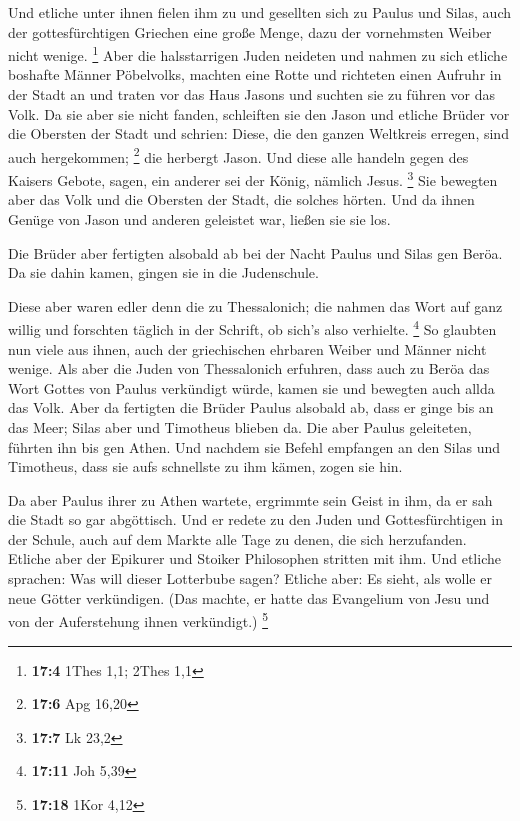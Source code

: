  Und etliche unter ihnen fielen ihm zu und gesellten sich
zu Paulus und Silas, auch der gottesfürchtigen Griechen eine große
Menge, dazu der vornehmsten Weiber nicht wenige. \footnote{\textbf{17:4}
  1Thes 1,1; 2Thes 1,1}  Aber die halsstarrigen Juden
neideten und nahmen zu sich etliche boshafte Männer Pöbelvolks, machten
eine Rotte und richteten einen Aufruhr in der Stadt an und traten vor
das Haus Jasons und suchten sie zu führen vor das Volk. 
Da sie aber sie nicht fanden, schleiften sie den Jason und etliche
Brüder vor die Obersten der Stadt und schrien: Diese, die den ganzen
Weltkreis erregen, sind auch hergekommen; \footnote{\textbf{17:6} Apg
  16,20}  die herbergt Jason. Und diese alle handeln gegen
des Kaisers Gebote, sagen, ein anderer sei der König, nämlich Jesus.
\footnote{\textbf{17:7} Lk 23,2}  Sie bewegten aber das
Volk und die Obersten der Stadt, die solches hörten.  Und
da ihnen Genüge von Jason und anderen geleistet war, ließen sie sie los.

 Die Brüder aber fertigten alsobald ab bei der Nacht
Paulus und Silas gen Beröa. Da sie dahin kamen, gingen sie in die
Judenschule.

 Diese aber waren edler denn die zu Thessalonich; die
nahmen das Wort auf ganz willig und forschten täglich in der Schrift, ob
sich's also verhielte. \footnote{\textbf{17:11} Joh 5,39}
 So glaubten nun viele aus ihnen, auch der griechischen
ehrbaren Weiber und Männer nicht wenige.  Als aber die
Juden von Thessalonich erfuhren, dass auch zu Beröa das Wort Gottes von
Paulus verkündigt würde, kamen sie und bewegten auch allda das Volk.
 Aber da fertigten die Brüder Paulus alsobald ab, dass er
ginge bis an das Meer; Silas aber und Timotheus blieben da.
 Die aber Paulus geleiteten, führten ihn bis gen Athen.
Und nachdem sie Befehl empfangen an den Silas und Timotheus, dass sie
aufs schnellste zu ihm kämen, zogen sie hin.

 Da aber Paulus ihrer zu Athen wartete, ergrimmte sein
Geist in ihm, da er sah die Stadt so gar abgöttisch.  Und
er redete zu den Juden und Gottesfürchtigen in der Schule, auch auf dem
Markte alle Tage zu denen, die sich herzufanden.  Etliche
aber der Epikurer und Stoiker Philosophen stritten mit ihm. Und etliche
sprachen: Was will dieser Lotterbube sagen? Etliche aber: Es sieht, als
wolle er neue Götter verkündigen. (Das machte, er hatte das Evangelium
von Jesu und von der Auferstehung ihnen verkündigt.) \footnote{\textbf{17:18}
  1Kor 4,12}

